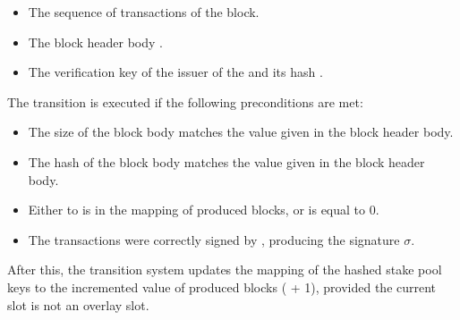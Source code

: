 \begin{itemize}
\item The sequence of transactions  of the block.
\item The block header body .
\item The verification key  of the issuer of the  and its
  hash .
\end{itemize}

The transition is executed if the following preconditions are met:

\begin{itemize}
\item The size of the block body matches the value given in the block header body.
\item The hash of the block body matches the value given in the block header body.
\item Either  to  is in the mapping of produced blocks, or
   is equal to 0.
\item The transactions  were correctly signed by , producing
  the signature $\sigma$.
\end{itemize}

After this, the transition system updates the mapping of the hashed stake pool
keys to the incremented value of produced blocks ( + 1), provided the
current slot is not an overlay slot.

